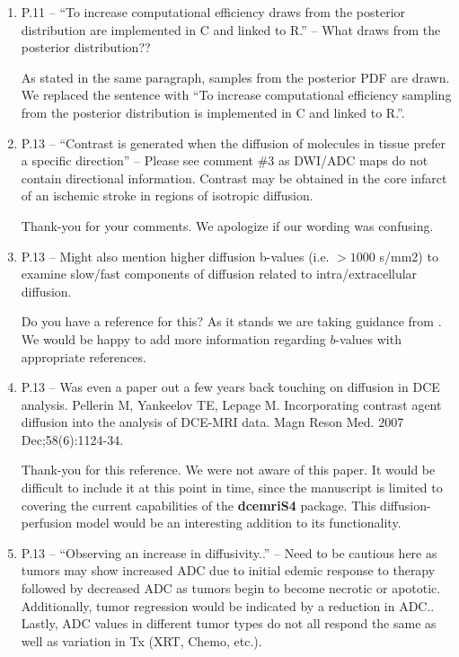 \documentclass[11pt]{article}
\begin{document}
\begin{enumerate}
\item P.11 – ``To increase computational efficiency draws from the
  posterior distribution are implemented in C and linked to R.'' –
  What draws from the posterior distribution??

  As stated in the same paragraph, samples from the posterior PDF are
  drawn.  We replaced the sentence with ``To increase computational
  efficiency sampling from the posterior distribution is implemented
  in \textsf{C} and linked to \textsf{R}.''.

\item P.13 – ``Contrast is generated when the diffusion of molecules
  in tissue prefer a specific direction'' – Please see comment \#3 as
  DWI/ADC maps do not contain directional information.  Contrast may
  be obtained in the core infarct of an ischemic stroke in regions of
  isotropic diffusion.

  Thank-you for your comments.  We apologize if our wording was
  confusing.

\item P.13 – Might also mention higher diffusion b-values
  (i.e. $>1000$ s/mm2) to examine slow/fast components of diffusion
  related to intra/extracellular diffusion.

  Do you have a reference for this?  As it stands we are taking
  guidance from \citet{pad-etal:neoplasia}.  We would be happy to add
  more information regarding $b$-values with appropriate references.

\item P.13 – Was even a paper out a few years back touching on
  diffusion in DCE analysis.  Pellerin M, Yankeelov TE, Lepage
  M. Incorporating contrast agent diffusion into the analysis of
  DCE-MRI data. Magn Reson Med. 2007 Dec;58(6):1124-34.

  Thank-you for this reference.  We were not aware of this paper.  It
  would be difficult to include it at this point in time, since the
  manuscript is limited to covering the current capabilities of the
  \textbf{dcemriS4} package.  This diffusion-perfusion model would be
  an interesting addition to its functionality.

\item P.13 – ``Observing an increase in diffusivity..'' – Need to be
  cautious here as tumors may show increased ADC due to initial edemic
  response to therapy followed by decreased ADC as tumors begin to
  become necrotic or apototic. Additionally, tumor regression would be
  indicated by a reduction in ADC.. Lastly, ADC values in different
  tumor types do not all respond the same as well as variation in Tx
  (XRT, Chemo, etc.).


\end{enumerate}
\end{document}

